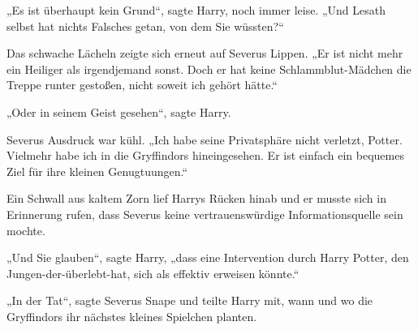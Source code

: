 „Es ist überhaupt kein Grund“, sagte Harry, noch immer leise. „Und Lesath selbst hat nichts Falsches getan, von dem Sie wüssten?“

Das schwache Lächeln zeigte sich erneut auf Severus Lippen. „Er ist nicht mehr ein Heiliger als irgendjemand sonst. Doch er hat keine Schlammblut-Mädchen die Treppe runter gestoßen, nicht soweit ich gehört hätte.“

„Oder in seinem Geist gesehen“, sagte Harry.

Severus Ausdruck war kühl. „Ich habe seine Privatsphäre nicht verletzt, Potter. Vielmehr habe ich in die Gryffindors hineingesehen. Er ist einfach ein bequemes Ziel für ihre kleinen Genugtuungen.“

Ein Schwall aus kaltem Zorn lief Harrys Rücken hinab und er musste sich in Erinnerung rufen, dass Severus keine vertrauenswürdige Informationsquelle sein mochte.

„Und Sie glauben“, sagte Harry, „dass eine Intervention durch Harry Potter, den Jungen-der-überlebt-hat, sich als effektiv erweisen könnte.“

„In der Tat“, sagte Severus Snape und teilte Harry mit, wann und wo die Gryffindors ihr nächstes kleines Spielchen planten.

\later

